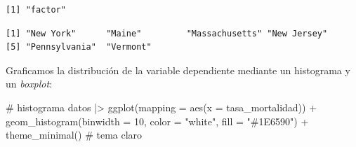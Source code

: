 \documentclass[
  spanish,
  a4paper,
]{scrbook}
\newenvironment{Shaded}{\begin{snugshade}}{\end{snugshade}}
\newcommand{\AttributeTok}[1]{\textcolor[rgb]{0.40,0.45,0.13}{#1}}
\newcommand{\CommentTok}[1]{\textcolor[rgb]{0.37,0.37,0.37}{#1}}
\newcommand{\DecValTok}[1]{\textcolor[rgb]{0.68,0.00,0.00}{#1}}
\newcommand{\FunctionTok}[1]{\textcolor[rgb]{0.28,0.35,0.67}{#1}}
\newcommand{\NormalTok}[1]{\textcolor[rgb]{0.00,0.23,0.31}{#1}}
\newcommand{\OtherTok}[1]{\textcolor[rgb]{0.00,0.23,0.31}{#1}}
\newcommand{\SpecialCharTok}[1]{\textcolor[rgb]{0.37,0.37,0.37}{#1}}
\newcommand{\StringTok}[1]{\textcolor[rgb]{0.13,0.47,0.30}{#1}}
\begin{document}
\begin{Shaded}
\end{Shaded}

\begin{verbatim}
[1] "factor"
\end{verbatim}

\begin{Shaded}
\end{Shaded}

\begin{verbatim}
[1] "New York"      "Maine"         "Massachusetts" "New Jersey"   
[5] "Pennsylvania"  "Vermont"      
\end{verbatim}

Graficamos la distribución de la variable dependiente mediante un
histograma y un \emph{boxplot}:

\begin{Shaded}
\begin{Highlighting}[]
\CommentTok{\# histograma}
\NormalTok{datos }\SpecialCharTok{|\textgreater{}}
  \FunctionTok{ggplot}\NormalTok{(}\AttributeTok{mapping =} \FunctionTok{aes}\NormalTok{(}\AttributeTok{x =}\NormalTok{ tasa\_mortalidad)) }\SpecialCharTok{+}
  \FunctionTok{geom\_histogram}\NormalTok{(}\AttributeTok{binwidth =} \DecValTok{10}\NormalTok{, }\AttributeTok{color =} \StringTok{"white"}\NormalTok{, }\AttributeTok{fill =} \StringTok{"\#1E6590"}\NormalTok{) }\SpecialCharTok{+}
  \FunctionTok{theme\_minimal}\NormalTok{() }\CommentTok{\# tema claro}
\end{Highlighting}
\end{Shaded}
\end{document}
